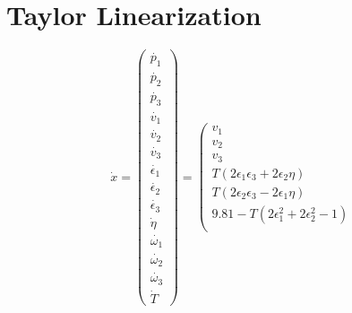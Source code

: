 \documentclass{beamer}
\begin{document}


\section{Taylor Linearization}
\begin{frame}
    \begin{equation*}
        \dot{x}=\left(\begin{array}{c}
                \dot{p_{1}}        \\
                \dot{p_{2}}        \\
                \dot{p_{3}}        \\
                \dot{v_{1}}        \\
                \dot{v_{2}}        \\
                \dot{v_{3}}        \\
                \dot{\epsilon_{1}} \\
                \dot{\epsilon_{2}} \\
                \dot{\epsilon_{3}} \\
                \dot{\eta}         \\
                \dot{\omega_{1}}   \\
                \dot{\omega_{2}}   \\
                \dot{\omega_{3}}   \\
                \dot{T}
            \end{array}\right)=\left(\begin{array}{c}
                v_{1}                                                                                                  \\
                v_{2}                                                                                                  \\
                v_{3}                                                                                                  \\
                T\left(2 \epsilon_{1} \epsilon_{3}+2 \epsilon_{2} \eta\right)                                          \\
                T\left(2 \epsilon_{2} \epsilon_{3}-2 \epsilon_{1} \eta\right)                                          \\
                9.81-T\left(2 \epsilon_{1}^{2}+2 \epsilon_{2}^{2}-1\right)                                             \\

\end{array}
\end{equation*}
\end{frame}
\end{document}
